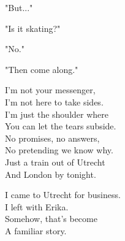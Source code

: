 \begin{lyrics}
"But..."

"Is it skating?"

"No."

"Then come along."

I'm not your messenger,\\
I'm not here to take sides.\\
I'm just the shoulder where\\
You can let the tears subside.\\
No promises, no answers,\\
No pretending we know why.\\
Just a train out of Utrecht\\
And London by tonight.

I came to Utrecht for business.\\
I left with Erika.\\
Somehow, that's become\\
A familiar story.
\end{lyrics}
